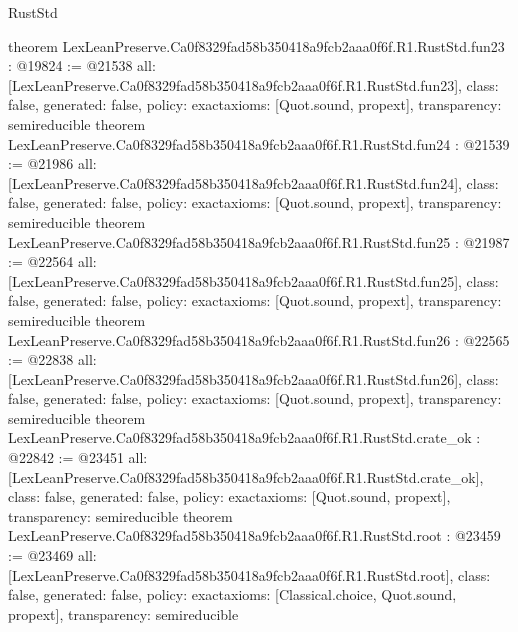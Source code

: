 \begin{lexlean}{RustStd}
\begin{coremodule}
{}
theorem LexLeanPreserve.Ca0f8329fad58b350418a9fcb2aaa0f6f.R1.RustStd.fun23 : @19824 := @21538 {
  all: [LexLeanPreserve.Ca0f8329fad58b350418a9fcb2aaa0f6f.R1.RustStd.fun23],
  class: false,
  generated: false,
  policy: exact{axioms: [Quot.sound, propext]},
  transparency: semireducible
}
theorem LexLeanPreserve.Ca0f8329fad58b350418a9fcb2aaa0f6f.R1.RustStd.fun24 : @21539 := @21986 {
  all: [LexLeanPreserve.Ca0f8329fad58b350418a9fcb2aaa0f6f.R1.RustStd.fun24],
  class: false,
  generated: false,
  policy: exact{axioms: [Quot.sound, propext]},
  transparency: semireducible
}
theorem LexLeanPreserve.Ca0f8329fad58b350418a9fcb2aaa0f6f.R1.RustStd.fun25 : @21987 := @22564 {
  all: [LexLeanPreserve.Ca0f8329fad58b350418a9fcb2aaa0f6f.R1.RustStd.fun25],
  class: false,
  generated: false,
  policy: exact{axioms: [Quot.sound, propext]},
  transparency: semireducible
}
theorem LexLeanPreserve.Ca0f8329fad58b350418a9fcb2aaa0f6f.R1.RustStd.fun26 : @22565 := @22838 {
  all: [LexLeanPreserve.Ca0f8329fad58b350418a9fcb2aaa0f6f.R1.RustStd.fun26],
  class: false,
  generated: false,
  policy: exact{axioms: [Quot.sound, propext]},
  transparency: semireducible
}
theorem LexLeanPreserve.Ca0f8329fad58b350418a9fcb2aaa0f6f.R1.RustStd.crate_ok : @22842 := @23451 {
  all: [LexLeanPreserve.Ca0f8329fad58b350418a9fcb2aaa0f6f.R1.RustStd.crate_ok],
  class: false,
  generated: false,
  policy: exact{axioms: [Quot.sound, propext]},
  transparency: semireducible
}
theorem LexLeanPreserve.Ca0f8329fad58b350418a9fcb2aaa0f6f.R1.RustStd.root : @23459 := @23469 {
  all: [LexLeanPreserve.Ca0f8329fad58b350418a9fcb2aaa0f6f.R1.RustStd.root],
  class: false,
  generated: false,
  policy: exact{axioms: [Classical.choice, Quot.sound, propext]},
  transparency: semireducible
}


\end{coremodule}
\end{lexlean}
